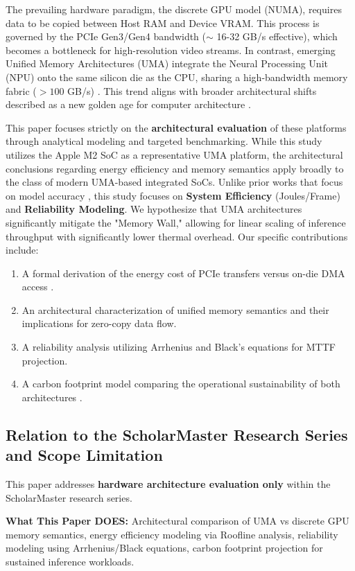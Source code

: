 \documentclass[conference]{IEEEtran}
\begin{document}
The prevailing hardware paradigm, the discrete GPU model (NUMA), requires data to be copied between Host RAM and Device VRAM. This process is governed by the PCIe Gen3/Gen4 bandwidth ($\sim$ 16-32 GB/s effective), which becomes a bottleneck for high-resolution video streams. In contrast, emerging Unified Memory Architectures (UMA) integrate the Neural Processing Unit (NPU) onto the same silicon die as the CPU, sharing a high-bandwidth memory fabric ($>100$ GB/s) \cite{b16, b11}. This trend aligns with broader architectural shifts described as a new golden age for computer architecture \cite{b29}.

This paper focuses strictly on the \textbf{architectural evaluation} of these platforms through analytical modeling and targeted benchmarking. While this study utilizes the Apple M2 SoC as a representative UMA platform, the architectural conclusions regarding energy efficiency and memory semantics apply broadly to the class of modern UMA-based integrated SoCs. Unlike prior works that focus on model accuracy \cite{b11}, this study focuses on \textbf{System Efficiency} (Joules/Frame) and \textbf{Reliability Modeling}. We hypothesize that UMA architectures significantly mitigate the "Memory Wall," allowing for linear scaling of inference throughput with significantly lower thermal overhead. Our specific contributions include:
\begin{enumerate}
    \item A formal derivation of the energy cost of PCIe transfers versus on-die DMA access \cite{b8, b1}.
    \item An architectural characterization of unified memory semantics and their implications for zero-copy data flow.
    \item A reliability analysis utilizing Arrhenius and Black's equations for MTTF projection.
    \item A carbon footprint model comparing the operational sustainability of both architectures \cite{b12}.
\end{enumerate}

\subsection{Relation to the ScholarMaster Research Series and Scope Limitation}

This paper addresses \textbf{hardware architecture evaluation only} within the ScholarMaster research series.

\textbf{What This Paper DOES:}
Architectural comparison of UMA vs discrete GPU memory semantics, energy efficiency modeling via Roofline analysis, reliability modeling using Arrhenius/Black equations, carbon footprint projection for sustained inference workloads.
\end{document}
